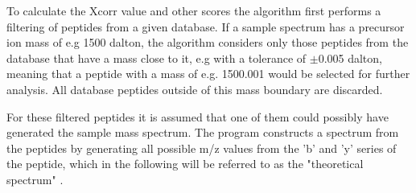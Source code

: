 \documentclass[11pt]{article}
\begin{document}
To calculate the Xcorr value and other scores the algorithm first performs a filtering of peptides from a given database. If a sample spectrum has a precursor ion mass of e.g 1500 dalton, the algorithm considers only those peptides from the database that have a mass close to it, e.g with a tolerance of  $\pm$0.005 dalton, meaning that a peptide with a mass of e.g. 1500.001 would be selected for further analysis. All database peptides outside of this mass boundary are discarded.

For these filtered peptides it is assumed that one of them could possibly have generated the sample mass spectrum. The program constructs a spectrum from the peptides by generating all possible m/z values from the 'b' and 'y' series of the peptide, which in the following will be referred to as the "theoretical spectrum" \cite{comet-first-paper}. 
\end{document}
